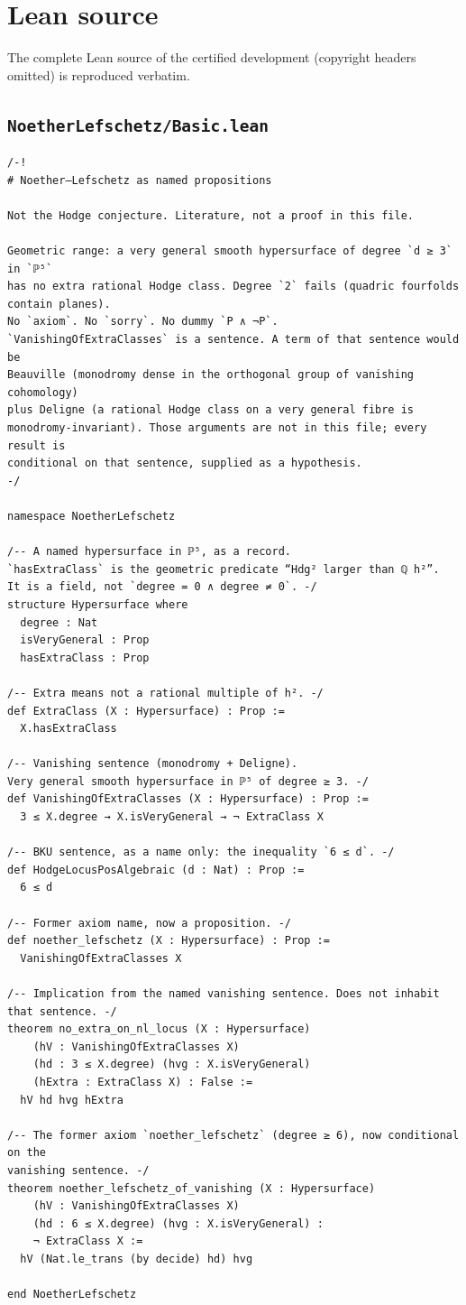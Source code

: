 \documentclass[11pt]{amsart}
\theoremstyle{definition}
\theoremstyle{remark}
\begin{document}
\appendix
\section{Lean source}
The complete Lean source of the certified development (copyright headers omitted) is reproduced verbatim.
\subsection*{\texttt{NoetherLefschetz/Basic.lean}}
\begin{verbatim}
/-!
# Noether–Lefschetz as named propositions

Not the Hodge conjecture. Literature, not a proof in this file.

Geometric range: a very general smooth hypersurface of degree `d ≥ 3` in `ℙ⁵`
has no extra rational Hodge class. Degree `2` fails (quadric fourfolds contain planes).
No `axiom`. No `sorry`. No dummy `P ∧ ¬P`.
`VanishingOfExtraClasses` is a sentence. A term of that sentence would be
Beauville (monodromy dense in the orthogonal group of vanishing cohomology)
plus Deligne (a rational Hodge class on a very general fibre is
monodromy-invariant). Those arguments are not in this file; every result is
conditional on that sentence, supplied as a hypothesis.
-/

namespace NoetherLefschetz

/-- A named hypersurface in ℙ⁵, as a record.
`hasExtraClass` is the geometric predicate “Hdg² larger than ℚ h²”.
It is a field, not `degree = 0 ∧ degree ≠ 0`. -/
structure Hypersurface where
  degree : Nat
  isVeryGeneral : Prop
  hasExtraClass : Prop

/-- Extra means not a rational multiple of h². -/
def ExtraClass (X : Hypersurface) : Prop :=
  X.hasExtraClass

/-- Vanishing sentence (monodromy + Deligne).
Very general smooth hypersurface in ℙ⁵ of degree ≥ 3. -/
def VanishingOfExtraClasses (X : Hypersurface) : Prop :=
  3 ≤ X.degree → X.isVeryGeneral → ¬ ExtraClass X

/-- BKU sentence, as a name only: the inequality `6 ≤ d`. -/
def HodgeLocusPosAlgebraic (d : Nat) : Prop :=
  6 ≤ d

/-- Former axiom name, now a proposition. -/
def noether_lefschetz (X : Hypersurface) : Prop :=
  VanishingOfExtraClasses X

/-- Implication from the named vanishing sentence. Does not inhabit that sentence. -/
theorem no_extra_on_nl_locus (X : Hypersurface)
    (hV : VanishingOfExtraClasses X)
    (hd : 3 ≤ X.degree) (hvg : X.isVeryGeneral)
    (hExtra : ExtraClass X) : False :=
  hV hd hvg hExtra

/-- The former axiom `noether_lefschetz` (degree ≥ 6), now conditional on the
vanishing sentence. -/
theorem noether_lefschetz_of_vanishing (X : Hypersurface)
    (hV : VanishingOfExtraClasses X)
    (hd : 6 ≤ X.degree) (hvg : X.isVeryGeneral) :
    ¬ ExtraClass X :=
  hV (Nat.le_trans (by decide) hd) hvg

end NoetherLefschetz
\end{verbatim}
\end{document}
